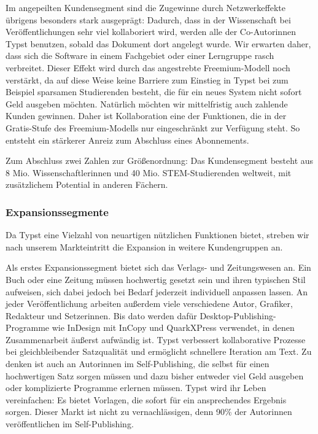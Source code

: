 \documentclass[11pt, a4paper]{article}
\newcommand{\gender}{\raisebox{-.25em}{*}}
\renewcommand{\glossary} {\marginsymbol{\textbf{↪}}}
\newcommand{\cited}[1]{\marginsymbol{\textbf{↗} #1}}
\newcommand{\marginsymbol}[1] {\protect\marginsymbolhelper{#1}}
\newcommand{\marginsymbolhelper}[1] {\tabto*{-1cm}\makebox[0cm]{#1}\tabto*{\TabPrevPos}}
\begin{document}
Im angepeilten Kundensegment sind die Zugewinne durch \glossary Netzwerkeffekte übrigens besonders stark ausgeprägt: Dadurch, dass in der Wissenschaft bei Veröffentlichungen sehr viel kollaboriert wird, werden alle der Co-Autor\gender{}innen Typst benutzen, sobald das Dokument dort angelegt wurde. Wir erwarten daher, dass sich die Software in einem Fachgebiet oder einer Lerngruppe rasch verbreitet. Dieser Effekt wird durch das angestrebte \glossary Freemium-Modell noch verstärkt, da auf diese Weise keine Barriere zum Einstieg in Typst bei zum Beispiel sparsamen Studierenden besteht, die für ein neues System nicht sofort Geld ausgeben möchten. Natürlich möchten wir mittelfristig auch zahlende Kunden gewinnen. Daher ist Kollaboration eine der Funktionen, die in der Gratis-Stufe des Freemium-Modells nur eingeschränkt zur Verfügung steht. So entsteht ein stärkerer Anreiz zum Abschluss eines Abonnements.


Zum Abschluss zwei Zahlen zur Größenordnung: Das Kundensegment besteht aus \cited{7}8 Mio. Wissenschaftler\gender{}innen und \cited{8}40 Mio. STEM-Studierenden weltweit, mit zusätzlichem Potential in anderen Fächern.

\subsubsection*{Expansionssegmente}

Da Typst eine Vielzahl von neuartigen nützlichen Funktionen bietet, streben wir nach unserem Markteintritt die Expansion in weitere Kundengruppen an.

Als erstes Expansionssegment bietet sich das Verlags- und Zeitungswesen an. Ein Buch oder eine Zeitung müssen hochwertig gesetzt sein und ihren typischen Stil aufweisen, sich dabei jedoch bei Bedarf jederzeit individuell anpassen lassen. An jeder Veröffentlichung arbeiten außerdem viele verschiedene Autor\gender{}, Grafiker\gender{}, Redakteur\gender{} und Setzer\gender{}innen. Bis dato werden dafür Desktop-Publishing-Programme wie InDesign mit InCopy und QuarkXPress verwendet, in denen Zusammenarbeit äußerst aufwändig ist. Typst verbessert kollaborative Prozesse bei gleichbleibender Satzqualität und ermöglicht schnellere Iteration am Text. Zu denken ist auch an Autor\gender{}innen im Self-Publishing, die selbst für einen hochwertigen Satz sorgen müssen und dazu bisher entweder viel Geld ausgeben oder komplizierte Programme erlernen müssen. Typst wird ihr Leben vereinfachen: Es bietet Vorlagen, die sofort für ein ansprechendes Ergebnis sorgen. Dieser Markt ist nicht zu vernachlässigen, denn \cited{9} 90\% der Autor\gender{}innen veröffentlichen im Self-Publishing.
\end{document}
